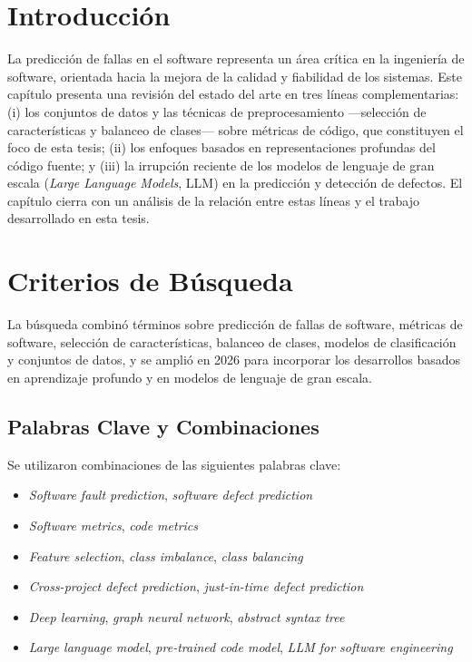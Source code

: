 \section{Introducción}
La predicción de fallas en el software representa un área crítica en la ingeniería de software, orientada hacia la mejora de la calidad y fiabilidad de los sistemas. Este capítulo presenta una revisión del estado del arte en tres líneas complementarias: (i) los conjuntos de datos y las técnicas de preprocesamiento ---selección de características y balanceo de clases--- sobre métricas de código, que constituyen el foco de esta tesis; (ii) los enfoques basados en representaciones profundas del código fuente; y (iii) la irrupción reciente de los modelos de lenguaje de gran escala (\textit{Large Language Models}, LLM) en la predicción y detección de defectos. El capítulo cierra con un análisis de la relación entre estas líneas y el trabajo desarrollado en esta tesis.

\section{Criterios de Búsqueda}

La búsqueda combinó términos sobre predicción de fallas de software, métricas de software, selección de características, balanceo de clases, modelos de clasificación y conjuntos de datos, y se amplió en 2026 para incorporar los desarrollos basados en aprendizaje profundo y en modelos de lenguaje de gran escala.

\subsection{Palabras Clave y Combinaciones}

Se utilizaron combinaciones de las siguientes palabras clave:
\begin{itemize}
    \item \textit{Software fault prediction}, \textit{software defect prediction}
    \item \textit{Software metrics}, \textit{code metrics}
    \item \textit{Feature selection}, \textit{class imbalance}, \textit{class balancing}
    \item \textit{Cross-project defect prediction}, \textit{just-in-time defect prediction}
    \item \textit{Deep learning}, \textit{graph neural network}, \textit{abstract syntax tree}
    \item \textit{Large language model}, \textit{pre-trained code model}, \textit{LLM for software engineering}
\end{itemize}

